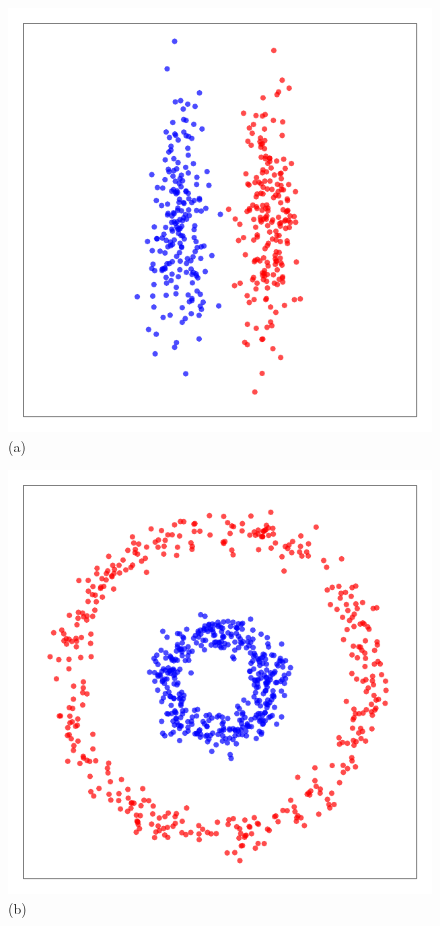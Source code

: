 \documentclass[aps,preprint,nofootinbib,floatfix]{revtex4-1}
\begin{document}
\begin{figure}
\begin{minipage}{0.24\textwidth}
\includegraphics[width=1\textwidth]{2cigars.pdf}\\[-1em] (a)
\end{minipage}
\begin{minipage}{0.24\textwidth}
\includegraphics[width=1\textwidth]{2circles.pdf}\\[-1em] (b)

\end{minipage}
\end{figure}
\end{document}
